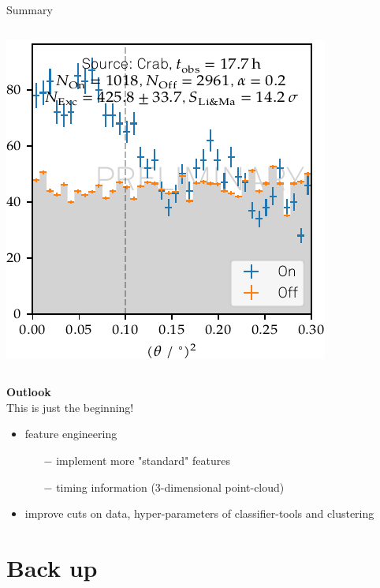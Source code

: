 \begin{frame}[t]{Summary}
\begin{columns}[onlytextwidth]
\begin{column}{0.3\textwidth}
            \includegraphics[width=\textwidth]{fig/theta2_plot.pdf}
        \end{column}
    \end{columns}
\textbf{{\color{tugreen} Outlook}} \\
This is just the beginning!
\begin{itemize}
    \item feature engineering
        \begin{itemize}
            \item[$-$] implement more "standard" features
            \item[$-$] timing information (3-dimensional point-cloud)
        \end{itemize}
    \item improve cuts on data, hyper-parameters of classifier-tools and clustering
\end{itemize}
\end{frame}



\section{Back up}
\appendix

